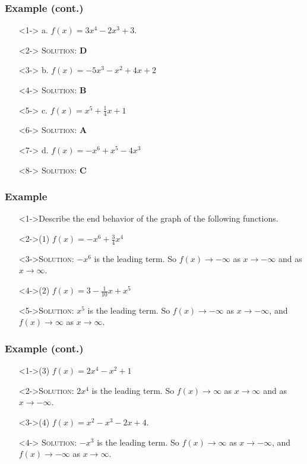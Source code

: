 \documentclass{beamer}
\begin{document}
\begin{frame}
  \frametitle{Example (cont.)}
    \begin{enumerate}
      \item[]<1-> a. $f(x)=3x^{4}-2x^{3}+3$.
      \item[]<2-> \textsc{Solution:} \textbf{D}
      \item[]<3-> b. $f(x)=-5x^{3}-x^{2}+4x+2$
      \item[]<4-> \textsc{Solution:} \textbf{B}
      \item[]<5-> c. $f(x)=x^{5}+\frac{1}{4}x+1$
      \item[]<6-> \textsc{Solution:} \textbf{A}
      \item[]<7-> d. $f(x)=-x^{6}+x^{5}-4x^{3}$
      \item[]<8-> \textsc{Solution:} \textbf{C}
    \end{enumerate}
\end{frame}

\begin{frame}
  \frametitle{Example}
  \begin{enumerate}
    \item[]<1->Describe the end behavior of the graph of the following functions.
    \item[]<2->($1$) $f(x)=-x^{6}+\frac{3}{4}x^{4}$
    \item[]<3->\textsc{Solution:} $-x^{6}$ is the leading term. So $f(x) \rightarrow -\infty$ as $x \rightarrow -\infty$ and as $x \rightarrow \infty$.
    \item[]<4->($2$) $f(x)=3-\frac{1}{10}x+x^{5}$
    \item[]<5->\textsc{Solution:} $x^{5}$ is the leading term. So $f(x) \rightarrow -\infty$ as $x \rightarrow -\infty$, and $f(x) \rightarrow \infty$ as $x \rightarrow \infty$.
  \end{enumerate}
\end{frame}

\begin{frame}
  \frametitle{Example (cont.)}
  \begin{enumerate}
    \item[]<1->($3$) $f(x)=2x^{4}-x^{2}+1$
    \item[]<2->\textsc{Solution:} $2x^{4}$ is the leading term.  So $f(x) \rightarrow \infty$ as $x \rightarrow \infty$ and as $x \rightarrow -\infty$.
    \item[]<3->($4$) $f(x)=x^{2}-x^{3}-2x+4$.
    \item[]<4-> \textsc{Solution:} $-x^{3}$ is the leading term.  So $f(x) \rightarrow \infty$ as $x \rightarrow -\infty$, and $f(x) \rightarrow -\infty$ as $x \rightarrow \infty$.
  \end{enumerate}
\end{frame}
\end{document}
